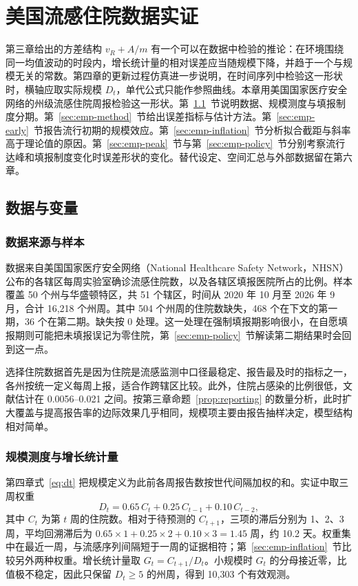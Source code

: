 \chapter{美国流感住院数据实证}
\label{chap:empirical}

第三章给出的方差结构 $v_R+A/m$ 有一个可以在数据中检验的推论：在环境围绕同一均值波动的时段内，增长统计量的相对误差应当随规模下降，并趋于一个与规模无关的常数。第四章的更新过程仿真进一步说明，在时间序列中检验这一形状时，横轴应取实际规模 $D_t$，单代公式只能作参照曲线。本章用美国国家医疗安全网络的州级流感住院周报检验这一形状。第~\ref{sec:emp-data}~节说明数据、规模测度与填报制度分期。第~\ref{sec:emp-method}~节给出误差指标与估计方法。第~\ref{sec:emp-early}~节报告流行初期的规模效应。第~\ref{sec:emp-inflation}~节分析拟合截距与斜率高于理论值的原因。第~\ref{sec:emp-peak}~节与第~\ref{sec:emp-policy}~节分别考察流行达峰和填报制度变化时误差形状的变化。替代设定、空间汇总与外部数据留在第六章。

\section{数据与变量}
\label{sec:emp-data}

\subsection{数据来源与样本}

数据来自美国国家医疗安全网络（National Healthcare Safety Network，NHSN）公布的各辖区每周实验室确诊流感住院数，以及各辖区填报医院所占的比例\citep{cdc2026nhsn}。样本覆盖 50 个州与华盛顿特区，共 51 个辖区，时间从 2020 年 10 月至 2026 年 9 月，合计 16,218 个州周。其中 504 个州周的住院数缺失，468 个在下文的第一期，36 个在第二期。缺失按 0 处理。这一处理在强制填报期影响很小，在自愿填报期则可能把未填报误记为零住院，第~\ref{sec:emp-policy}~节解读第二期结果时会回到这一点。

选择住院数据首先是因为住院是流感监测中口径最稳定、报告最及时的指标之一，各州按统一定义每周上报，适合作跨辖区比较。此外，住院占感染的比例很低，文献估计在 0.0056--0.021 之间\citep{zhou2012hospitalizations, tokars2018seasonal}。按第三章命题~\ref{prop:reporting} 的数量分析，此时扩大覆盖与提高报告率的边际效果几乎相同，规模项主要由报告抽样决定，模型结构相对简单。

\subsection{规模测度与增长统计量}

第四章式~\eqref{eq:dt} 把规模定义为此前各周报告数按世代间隔加权的和。实证中取三周权重
\begin{equation}
  D_t=0.65\,C_t+0.25\,C_{t-1}+0.10\,C_{t-2},
  \label{eq:dt-main}
\end{equation}
其中 $C_t$ 为第 $t$ 周的住院数。相对于待预测的 $C_{t+1}$，三项的滞后分别为 1、2、3 周，平均回溯滞后为 $0.65\times1+0.25\times2+0.10\times3=1.45$ 周，约 10.2 天。权重集中在最近一周，与流感序列间隔短于一周的证据相符\citep{cowling2009estimation, vink2014serial}；第~\ref{sec:emp-inflation}~节比较另外两种权重。增长统计量取 $G_t=C_{t+1}/D_t$。小规模时 $G_t$ 的分母接近零，比值极不稳定，因此只保留 $D_t\geq5$ 的州周，得到 10,303 个有效观测。

